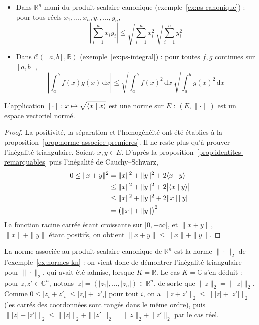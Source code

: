 \begin{exemple}
\begin{itemize}
\item Dans $\mathbb{R}^n$ muni du produit scalaire canonique (exemple~\ref{ex:ps-canonique}) : pour tous réels $x_1,\dots,x_n,y_1,\dots,y_n$,
\[\left|\sum_{i=1}^nx_iy_i\right|\leq\sqrt{\sum_{i=1}^nx_i^2}\,\sqrt{\sum_{i=1}^ny_i^2}\]
\item Dans $\mathcal{C}([a,b],\mathbb{R})$ (exemple~\ref{ex:ps-integral}) : pour toutes $f,g$ continues sur $[a,b]$,
\[\left|\int_a^bf(x)g(x)\,\mathrm{d}x\right|\leq\sqrt{\int_a^bf(x)^2\,\mathrm{d}x}\,\sqrt{\int_a^bg(x)^2\,\mathrm{d}x}\]
\end{itemize}
\end{exemple}

\begin{theo}
\label{theo:norme-euclidienne}
L'application $\|\cdot\|:x\mapsto\sqrt{\langle x\mid x\rangle}$ est une norme sur $E$ : $(E,\|\cdot\|)$ est un espace vectoriel normé.
\end{theo}

\begin{proof}
La positivité, la séparation et l'homogénéité ont été établies à la proposition~\ref{prop:norme-associee-premieres}. Il ne reste plus qu'à prouver l'inégalité triangulaire. Soient $x,y\in E$. D'après la proposition~\ref{prop:identites-remarquables} puis l'inégalité de Cauchy--Schwarz,
\begin{align*}
0\leq\|x+y\|^2&=\|x\|^2+\|y\|^2+2\langle x\mid y\rangle\\
&\leq\|x\|^2+\|y\|^2+2\big|\langle x\mid y\rangle\big|\\
&\leq\|x\|^2+\|y\|^2+2\|x\|\,\|y\|\\
&=\big(\|x\|+\|y\|\big)^2
\end{align*}
La fonction racine carrée étant croissante sur $[0,+\infty[$, et $\|x+y\|$, $\|x\|+\|y\|$ étant positifs, on obtient $\|x+y\|\leq\|x\|+\|y\|$.
\end{proof}

\begin{remarque}
La norme associée au produit scalaire canonique de $\mathbb{R}^n$ est la norme $\|\cdot\|_2$ de l'exemple~\ref{ex:normes-kn} : on vient donc de démontrer l'inégalité triangulaire pour $\|\cdot\|_2$, qui avait été admise, lorsque $K=\mathbb{R}$. Le cas $K=\mathbb{C}$ s'en déduit : pour $z,z'\in\mathbb{C}^n$, notons $|z|=(|z_1|,\dots,|z_n|)\in\mathbb{R}^n$, de sorte que $\|z\|_2=\||z|\|_2$. Comme $0\leq|z_i+z'_i|\leq|z_i|+|z'_i|$ pour tout $i$, on a $\|z+z'\|_2\leq\||z|+|z'|\|_2$ (les carrés des coordonnées sont rangés dans le même ordre), puis $\||z|+|z'|\|_2\leq\||z|\|_2+\||z'|\|_2=\|z\|_2+\|z'\|_2$ par le cas réel.
\end{remarque}

